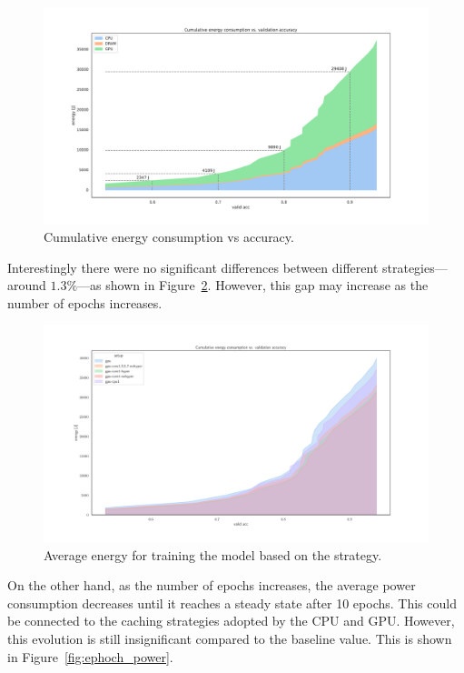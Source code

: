 \begin{figure}
    \centering
    \includegraphics[width=1.1\textwidth]{imgs/cumulative_energy_vs_accuracy}
    \caption{Cumulative energy consumption vs accuracy.}
    \label{fig:cum_energy_vs_accuracy}
\end{figure}

Interestingly there were no significant differences between different strategies---around $1.3\%$---as shown in Figure~\ref{fig:av_energy_setup}.
However, this gap may increase as the number of epochs increases.

\begin{figure}
    \centering
    \includegraphics[width=1.1\textwidth]{imgs/cumulative_energy_fast10.pdf}
    \caption{Average energy for training the model based on the strategy.}
    \label{fig:av_energy_setup}
\end{figure}

On the other hand, as the number of epochs increases, the average power consumption decreases until it reaches a steady state after 10 epochs.
This could be connected to the caching strategies adopted by the CPU and GPU.
However, this evolution is still insignificant compared to the baseline value.
This is shown in Figure~\ref{fig:ephoch_power}.

